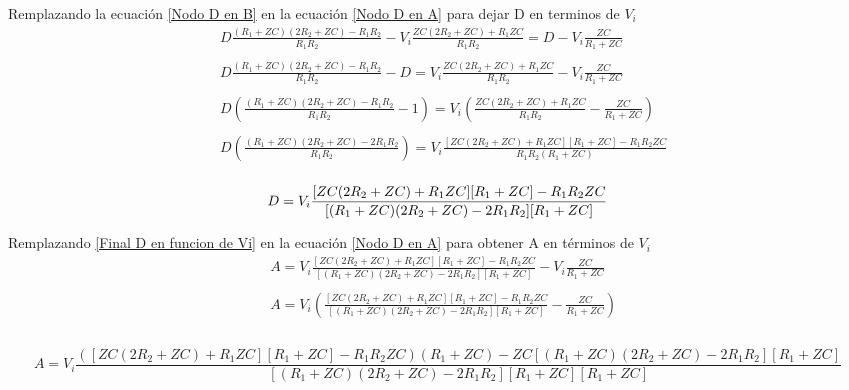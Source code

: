         Remplazando la ecuación \ref{Nodo D en B} en la ecuación \ref{Nodo D en A} para dejar D en terminos de $V_{i}$
        \begin{align*}
            &D\frac{ (R_{1}+ZC)(2R_{2}+ZC) - R_{1}R_{2} }{ R_{1}R_{2}} - V_{i}\frac{ ZC(2R_{2}+ZC)+ R_{1}ZC }{ R_{1}R_{2}} = D - V_{i}\frac{ZC}{R_{1}+ZC} \\\\
            &D\frac{ (R_{1}+ZC)(2R_{2}+ZC) -  R_{1}R_{2} }{ R_{1}R_{2}} - D = V_{i}\frac{ ZC(2R_{2}+ZC)+ R_{1}ZC }{ R_{1}R_{2}} - V_{i}\frac{ZC}{R_{1}+ZC} \\\\
            &D(\frac{ (R_{1}+ZC)(2R_{2}+ZC) -  R_{1}R_{2} }{ R_{1}R_{2} } - 1) = V_{i}(\frac{ ZC(2R_{2}+ZC)+ R_{1}ZC }{ R_{1}R_{2}} - \frac{ZC}{R_{1}+ZC}) \\\\
            &D(\frac{ (R_{1}+ZC)(2R_{2}+ZC) -  2R_{1}R_{2} }{ R_{1}R_{2} }) = V_{i}\frac{ [ZC(2R_{2}+ZC)+ R_{1}ZC][R_{1}+ZC] - R_{1}R_{2}ZC }{ R_{1}R_{2}(R_{1}+ZC)} \\\\
        \end{align*}
        \begin{equation}\label{Final D en funcion de Vi}
            D = V_{i}\frac{ [ZC(2R_{2}+ZC)+ R_{1}ZC][R_{1}+ZC] - R_{1}R_{2}ZC }{ [(R_{1}+ZC)(2R_{2}+ZC) -  2R_{1}R_{2}][R_{1}+ZC]} \\\\
        \end{equation}
    
        Remplazando \ref{Final D en funcion de Vi} en la ecuación \ref{Nodo D en A} para obtener A en términos de $V_{i}$
        \begin{align*}
            &A = V_{i}\frac{ [ZC(2R_{2}+ZC)+ R_{1}ZC][R_{1}+ZC] - R_{1}R_{2}ZC }{ [(R_{1}+ZC)(2R_{2}+ZC) -  2R_{1}R_{2}][R_{1}+ZC]} - V_{i}\frac{ZC}{R_{1}+ZC}\\\\
            &A = V_{i}(\frac{ [ZC(2R_{2}+ZC)+ R_{1}ZC][R_{1}+ZC] - R_{1}R_{2}ZC }{ [(R_{1}+ZC)(2R_{2}+ZC) -  2R_{1}R_{2}][R_{1}+ZC]} - \frac{ZC}{R_{1}+ZC})\\\\
        \end{align*}
        
        \begin{equation}\label{Final A en funcion de Vi}
            A = V_{i}\frac{ ([ZC(2R_{2}+ZC)+ R_{1}ZC][R_{1}+ZC] - R_{1}R_{2}ZC)(R_{1}+ZC) - ZC[(R_{1}+ZC)(2R_{2}+ZC) -  2R_{1}R_{2}][R_{1}+ZC] }{ [(R_{1}+ZC)(2R_{2}+ZC) -  2R_{1}R_{2}][R_{1}+ZC][R_{1}+ZC] }
        \end{equation}
    

